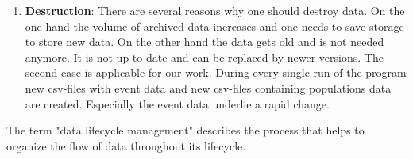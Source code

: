 \begin{enumerate}
	\item \textbf{Destruction}: There are several reasons why one should destroy data. On the one hand the volume of archived data increases and one needs to save storage to store new data. On the other hand the data gets old and is not needed anymore. It is not up to date and can be replaced by newer versions. The second case is applicable for our work. During every single run of the program new csv-files with event data and new csv-files containing populations data are created. Especially the event data underlie a rapid change.
\end{enumerate}

The term "data lifecycle management" describes the process that helps to organize the flow of data throughout its lifecycle.